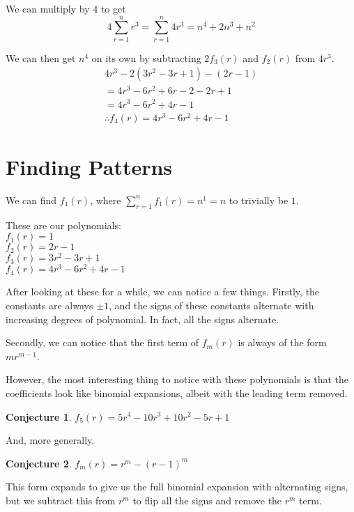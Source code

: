 \documentclass[a4paper]{article}
\newcommand{\sn}{\sum\limits_{r=1}^{n}}
\newtheorem{conjecture}{Conjecture}
\begin{document}
We can multiply by $4$ to get $$4 \sn r^3 = \sn 4r^3 = n^4 + 2n^3 + n^2$$

We can then get $n^4$ on its own by subtracting $2f_3(r)$ and $f_2(r)$ from $4r^3$.
\begin{gather*}
4r^3 - 2\left(3r^2 - 3r + 1\right) - (2r - 1)\\
= 4r^3 - 6r^2 + 6r - 2 - 2r + 1\\
= 4r^3 - 6r^2 + 4r - 1\\
\therefore f_4(r) = 4r^3 - 6r^2 + 4r - 1
\end{gather*}

\section{Finding Patterns}

We can find $f_1(r)$, where $\sn f_1(r) = n^1 = n$ to trivially be $1$.

These are our polynomials:\\[0.5em]
$f_1(r) = 1$\\[0.5em]
$f_2(r) = 2r - 1$\\[0.5em]
$f_3(r) = 3r^2 - 3r + 1$\\[0.5em]
$f_4(r) = 4r^3 - 6r^2 + 4r - 1$

After looking at these for a while, we can notice a few things. Firstly, the constants are always $\pm 1$, and the signs of these constants alternate with increasing degrees of polynomial. In fact, all the signs alternate.

Secondly, we can notice that the first term of $f_m(r)$ is always of the form $mr^{m-1}$.

However, the most interesting thing to notice with these polynomials is that the coefficients look like binomial expansions, albeit with the leading term removed.

\vspace{3em}

\begin{conjecture}
$f_5(r) = 5r^4 - 10r^3 + 10r^2 - 5r + 1$
\end{conjecture}

And, more generally,
\begin{conjecture}
$f_m(r) = r^m - (r - 1)^m$
\end{conjecture}

This form expands to give us the full binomial expansion with alternating signs, but we subtract this from $r^m$ to flip all the signs and remove the $r^m$ term.
\end{document}
